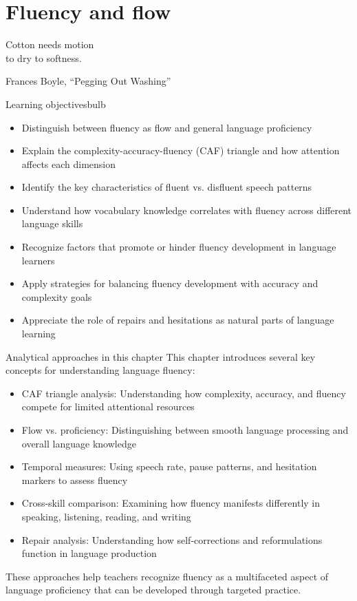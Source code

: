 \chapter{Fluency and flow} \label{ch:fluency}

\epigraph{Cotton needs motion\\
to dry to softness.}{Frances Boyle, \enquote{Pegging Out Washing}}

\begin{tblsframedsymbol}{Learning objectives}{bulb}
\begin{itemize}[noitemsep, leftmargin=*]
    \item Distinguish between fluency as flow and general language proficiency
    \item Explain the complexity-accuracy-fluency (CAF) triangle and how attention affects each dimension
    \item Identify the key characteristics of fluent vs. disfluent speech patterns
    \item Understand how vocabulary knowledge correlates with fluency across different language skills
    \item Recognize factors that promote or hinder fluency development in language learners
    \item Apply strategies for balancing fluency development with accuracy and complexity goals
    \item Appreciate the role of repairs and hesitations as natural parts of language learning
\end{itemize}
\end{tblsframedsymbol}

\begin{tblsfilled}{Analytical approaches in this chapter}
This chapter introduces several key concepts for understanding language fluency:
\begin{itemize}[noitemsep, leftmargin=*]
    \item CAF triangle analysis: Understanding how complexity, accuracy, and fluency compete for limited attentional resources
    \item Flow vs. proficiency: Distinguishing between smooth language processing and overall language knowledge
    \item Temporal measures: Using speech rate, pause patterns, and hesitation markers to assess fluency
    \item Cross-skill comparison: Examining how fluency manifests differently in speaking, listening, reading, and writing
    \item Repair analysis: Understanding how self-corrections and reformulations function in language production
\end{itemize}
These approaches help teachers recognize fluency as a multifaceted aspect of language proficiency that can be developed through targeted practice.
\end{tblsfilled}




